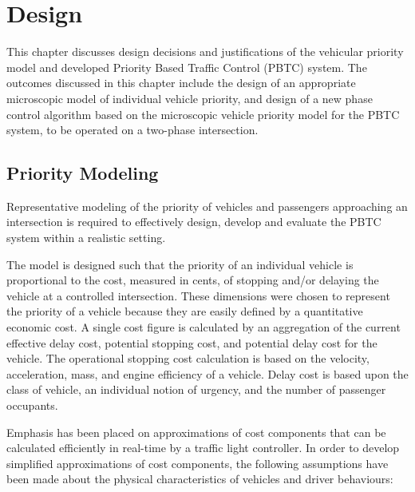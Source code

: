 \chapter{Design}
\label{chapter:design}

This chapter discusses design decisions and justifications of the vehicular priority model and developed Priority Based Traffic Control (PBTC) system. The outcomes discussed in this chapter include the design of an appropriate microscopic model of individual vehicle priority, and design of a new phase control algorithm based on the microscopic vehicle priority model for the PBTC system, to be operated on a two-phase intersection. 

\section{Priority Modeling}

Representative modeling of the priority of vehicles and passengers approaching an intersection is required to effectively design, develop and evaluate the PBTC system within a realistic setting. 

The model is designed such that the priority of an individual vehicle is proportional to the cost, measured in cents, of stopping and/or delaying the vehicle at a controlled intersection. These dimensions were chosen to represent the priority of a vehicle because they are easily defined by a quantitative economic cost. A single cost figure is calculated by an aggregation of the current effective delay cost, potential stopping cost, and potential delay cost for the vehicle. The operational stopping cost calculation is based on the velocity, acceleration, mass, and engine efficiency of a vehicle. Delay cost is based upon the class of vehicle, an individual notion of urgency, and the number of passenger occupants.

Emphasis has been placed on approximations of cost components that can be calculated efficiently in real-time by a traffic light controller. In order to develop simplified approximations of cost components, the following assumptions have been made about the physical characteristics of vehicles and driver behaviours:

